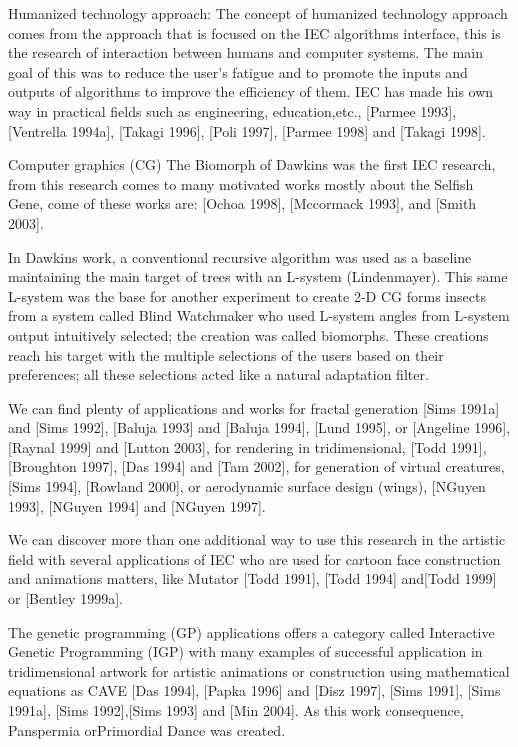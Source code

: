 Humanized technology approach: The concept of humanized technology approach
comes from the approach that is focused on the IEC algorithms interface, this is
the research of interaction between humans and computer systems. The main goal
of this was to reduce the user's fatigue and to promote the inputs and outputs
of algorithms to improve the efficiency of them. IEC has made his own way in
practical fields such as engineering, education,etc., [Parmee 1993], [Ventrella
1994a], [Takagi 1996], [Poli 1997], [Parmee 1998] and [Takagi 1998].


Computer graphics (CG) The Biomorph of Dawkins was the first IEC research, from
this research comes to many motivated works mostly about the Selfish Gene, come
of these works are:  [Ochoa 1998], [Mccormack 1993], and [Smith 2003].

In Dawkins work, a conventional recursive algorithm was used as a baseline
maintaining the main target of trees with an L-system (Lindenmayer). This same
L-system was the base for another experiment to create 2-D CG forms insects from
a system called Blind Watchmaker who used L-system angles from L-system output
intuitively selected; the creation was called biomorphs. These creations reach
his target with the multiple selections of the users based on their preferences;
all these selections acted like a natural adaptation filter.

We can find plenty of applications and works for fractal generation [Sims 1991a]
and [Sims 1992], [Baluja 1993] and [Baluja 1994], [Lund 1995], or [Angeline
1996],[Raynal 1999] and [Lutton 2003], for rendering in tridimensional, [Todd
1991],[Broughton 1997], [Das 1994] and [Tam 2002], for generation of virtual
creatures, [Sims 1994], [Rowland 2000], or aerodynamic surface design (wings),
[NGuyen 1993], [NGuyen 1994] and [NGuyen 1997].

We can discover more than one additional way to use this research in the
artistic field with several applications of IEC who are used for cartoon face
construction and animations matters, like Mutator [Todd 1991], [Todd 1994]
and[Todd 1999] or [Bentley 1999a].

The genetic programming (GP) applications offers a category called Interactive
Genetic Programming (IGP) with many examples of successful application in
tridimensional artwork for artistic animations or construction using
mathematical equations as CAVE [Das 1994], [Papka 1996] and [Disz 1997], [Sims
1991], [Sims 1991a], [Sims 1992],[Sims 1993] and [Min 2004]. As this work
consequence, Panspermia orPrimordial Dance was created.

